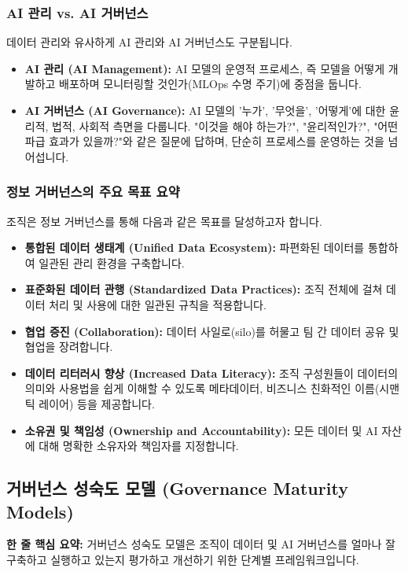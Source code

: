 \documentclass[11pt,a4paper]{article}
\theoremstyle{definition}
\begin{document}
\subsubsection*{AI 관리 vs. AI 거버넌스}
데이터 관리와 유사하게 AI 관리와 AI 거버넌스도 구분됩니다.
\begin{itemize}
    \item \textbf{AI 관리 (AI Management):} AI 모델의 운영적 프로세스, 즉 모델을 어떻게 개발하고 배포하며 모니터링할 것인가(MLOps 수명 주기)에 중점을 둡니다.
    \item \textbf{AI 거버넌스 (AI Governance):} AI 모델의 '누가', '무엇을', '어떻게'에 대한 윤리적, 법적, 사회적 측면을 다룹니다. "이것을 해야 하는가?", "윤리적인가?", "어떤 파급 효과가 있을까?"와 같은 질문에 답하며, 단순히 프로세스를 운영하는 것을 넘어섭니다.
\end{itemize}

\subsubsection*{정보 거버넌스의 주요 목표 요약}
조직은 정보 거버넌스를 통해 다음과 같은 목표를 달성하고자 합니다.
\begin{itemize}
    \item \textbf{통합된 데이터 생태계 (Unified Data Ecosystem):} 파편화된 데이터를 통합하여 일관된 관리 환경을 구축합니다.
    \item \textbf{표준화된 데이터 관행 (Standardized Data Practices):} 조직 전체에 걸쳐 데이터 처리 및 사용에 대한 일관된 규칙을 적용합니다.
    \item \textbf{협업 증진 (Collaboration):} 데이터 사일로(silo)를 허물고 팀 간 데이터 공유 및 협업을 장려합니다.
    \item \textbf{데이터 리터러시 향상 (Increased Data Literacy):} 조직 구성원들이 데이터의 의미와 사용법을 쉽게 이해할 수 있도록 메타데이터, 비즈니스 친화적인 이름(시맨틱 레이어) 등을 제공합니다.
    \item \textbf{소유권 및 책임성 (Ownership and Accountability):} 모든 데이터 및 AI 자산에 대해 명확한 소유자와 책임자를 지정합니다.
\end{itemize}

\newpage
\subsection*{거버넌스 성숙도 모델 (Governance Maturity Models)}

\begin{keyconceptbox}
\textbf{한 줄 핵심 요약:} 거버넌스 성숙도 모델은 조직이 데이터 및 AI 거버넌스를 얼마나 잘 구축하고 실행하고 있는지 평가하고 개선하기 위한 단계별 프레임워크입니다.
\end{keyconceptbox}
\end{document}
